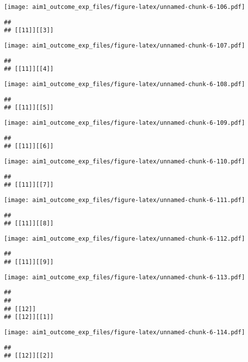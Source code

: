 \documentclass[
]{article}
\begin{document}
\texttt{[image: aim1\_outcome\_exp\_files/figure-latex/unnamed-chunk-6-106.pdf]}

\begin{verbatim}
## 
## [[11]][[3]]
\end{verbatim}

\texttt{[image: aim1\_outcome\_exp\_files/figure-latex/unnamed-chunk-6-107.pdf]}

\begin{verbatim}
## 
## [[11]][[4]]
\end{verbatim}

\texttt{[image: aim1\_outcome\_exp\_files/figure-latex/unnamed-chunk-6-108.pdf]}

\begin{verbatim}
## 
## [[11]][[5]]
\end{verbatim}

\texttt{[image: aim1\_outcome\_exp\_files/figure-latex/unnamed-chunk-6-109.pdf]}

\begin{verbatim}
## 
## [[11]][[6]]
\end{verbatim}

\texttt{[image: aim1\_outcome\_exp\_files/figure-latex/unnamed-chunk-6-110.pdf]}

\begin{verbatim}
## 
## [[11]][[7]]
\end{verbatim}

\texttt{[image: aim1\_outcome\_exp\_files/figure-latex/unnamed-chunk-6-111.pdf]}

\begin{verbatim}
## 
## [[11]][[8]]
\end{verbatim}

\texttt{[image: aim1\_outcome\_exp\_files/figure-latex/unnamed-chunk-6-112.pdf]}

\begin{verbatim}
## 
## [[11]][[9]]
\end{verbatim}

\texttt{[image: aim1\_outcome\_exp\_files/figure-latex/unnamed-chunk-6-113.pdf]}

\begin{verbatim}
## 
## 
## [[12]]
## [[12]][[1]]
\end{verbatim}

\texttt{[image: aim1\_outcome\_exp\_files/figure-latex/unnamed-chunk-6-114.pdf]}

\begin{verbatim}
## 
## [[12]][[2]]
\end{verbatim}
\end{document}
